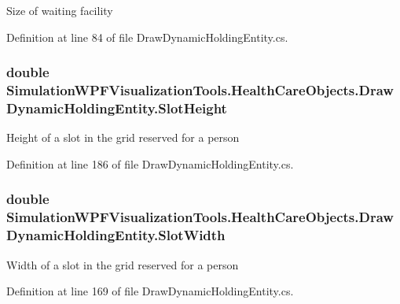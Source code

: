 Size of waiting facility 



Definition at line 84 of file Draw\+Dynamic\+Holding\+Entity.\+cs.

\subsubsection[{\texorpdfstring{Slot\+Height}{SlotHeight}}]{\setlength{\rightskip}{0pt plus 5cm}double Simulation\+W\+P\+F\+Visualization\+Tools.\+Health\+Care\+Objects.\+Draw\+Dynamic\+Holding\+Entity.\+Slot\+Height\hspace{0.3cm}{\ttfamily [get]}}\hypertarget{class_simulation_w_p_f_visualization_tools_1_1_health_care_objects_1_1_draw_dynamic_holding_entity_a143880cf7abc3de5144b89cdce156526}{}\label{class_simulation_w_p_f_visualization_tools_1_1_health_care_objects_1_1_draw_dynamic_holding_entity_a143880cf7abc3de5144b89cdce156526}


Height of a slot in the grid reserved for a person 



Definition at line 186 of file Draw\+Dynamic\+Holding\+Entity.\+cs.

\subsubsection[{\texorpdfstring{Slot\+Width}{SlotWidth}}]{\setlength{\rightskip}{0pt plus 5cm}double Simulation\+W\+P\+F\+Visualization\+Tools.\+Health\+Care\+Objects.\+Draw\+Dynamic\+Holding\+Entity.\+Slot\+Width\hspace{0.3cm}{\ttfamily [get]}}\hypertarget{class_simulation_w_p_f_visualization_tools_1_1_health_care_objects_1_1_draw_dynamic_holding_entity_a6432020604b25b838dfbc1f09d8abd9e}{}\label{class_simulation_w_p_f_visualization_tools_1_1_health_care_objects_1_1_draw_dynamic_holding_entity_a6432020604b25b838dfbc1f09d8abd9e}


Width of a slot in the grid reserved for a person 



Definition at line 169 of file Draw\+Dynamic\+Holding\+Entity.\+cs.


